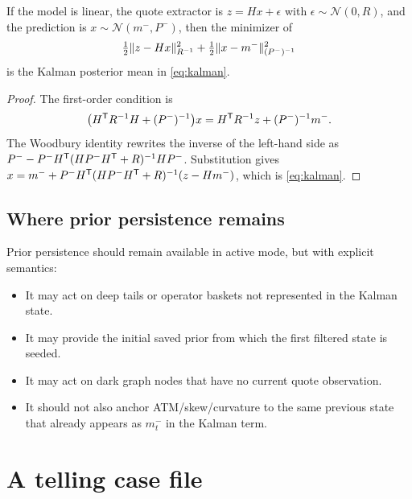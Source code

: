 \documentclass[11pt]{article}
\begin{document}
\begin{proposition}
\label{prop:nodouble}
If the model is linear, the quote extractor is $z=H x+\epsilon$ with
$\epsilon\sim\mathcal N(0,R)$, and the prediction is
$x\sim\mathcal N(m^-,P^-)$, then the minimizer of
\[
\tfrac12\lVert z-Hx\rVert_{R^{-1}}^2+\tfrac12\lVert x-m^-\rVert_{(P^-)^{-1}}^2
\]
is the Kalman posterior mean in \eqref{eq:kalman}.
\end{proposition}

\begin{proof}
The first-order condition is
\[
\big(H^{\mathsf{T}} R^{-1}H+(P^-)^{-1}\big)x
=H^{\mathsf{T}} R^{-1}z+(P^-)^{-1}m^- .
\]
The Woodbury identity rewrites the inverse of the left-hand side as
$P^- - P^-H^{\mathsf{T}}(HP^-H^{\mathsf{T}}+R)^{-1}HP^-$. Substitution gives
$x=m^-+P^-H^{\mathsf{T}}(HP^-H^{\mathsf{T}}+R)^{-1}(z-Hm^-)$, which is \eqref{eq:kalman}.
\end{proof}

\subsection{Where prior persistence remains}

Prior persistence should remain available in active mode, but with explicit
semantics:
\begin{itemize}[leftmargin=1.4em]
\item It may act on deep tails or operator baskets not represented in the
Kalman state.
\item It may provide the initial saved prior from which the first filtered state
is seeded.
\item It may act on dark graph nodes that have no current quote observation.
\item It should not also anchor ATM/skew/curvature to the same previous state
that already appears as $m_t^-$ in the Kalman term.
\end{itemize}

\section{A telling case file}
\label{sec:case}
\end{document}
